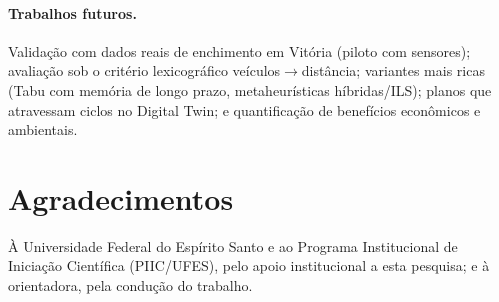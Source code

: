 \documentclass[12pt, a4paper]{article}
\begin{document}
\paragraph{Trabalhos futuros.} Validação com dados reais de enchimento em Vitória (piloto com sensores); avaliação sob o critério lexicográfico veículos$\rightarrow$distância; variantes mais ricas (Tabu com memória de longo prazo, metaheurísticas híbridas/ILS); planos que atravessam ciclos no Digital Twin; e quantificação de benefícios econômicos e ambientais.

\section*{Agradecimentos}
À Universidade Federal do Espírito Santo e ao Programa Institucional de Iniciação Científica (PIIC/UFES), pelo apoio institucional a esta pesquisa; e à orientadora, pela condução do trabalho.
\end{document}
